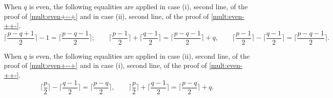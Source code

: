 \documentclass[10pt, a4paper, reqno]{amsart}
\begin{document}
\begin{rema}\label{useful_rel_q_even_ii} 
	When $q$ is even, the following equalities are applied in case (i), second line, of the proof of \eqref{mult:even+--+} and in case (ii), second line, of the proof of \eqref{mult:even-++-}.
	\[\lceil \frac{p-q+1}{2} \rceil-1 =\lceil \frac{p-q-1}{2} \rceil ; \qquad \lceil\frac{p-1}{2} \rceil+\lceil\frac{q-1}{2}\rceil=\lceil\frac{p-q-1}{2}\rceil+q,\qquad \lceil\frac{p-1}{2} \rceil-\lceil\frac{q-1}{2}\rceil=\lceil\frac{p-q-1}{2}\rceil.\] 
\end{rema}	

\begin{rema}\label{useful_rel_q_even_i} 
	When $q$ is even, the following equalities are applied in case (ii), second line, of the proof of \eqref{mult:even+--+} and in case (i), second line, of the proof of \eqref{mult:even-++-}.
	\[\lceil \frac{p}{2}\rceil- \lceil \frac{q-1}{2}\rceil=\lceil\frac{p-q}{2}\rceil,\qquad \lceil \frac{p}{2}\rceil+ \lceil \frac{q-1}{2}\rceil=\lceil\frac{p-q}{2}\rceil+q.\]
\end{rema}	
\end{document}
